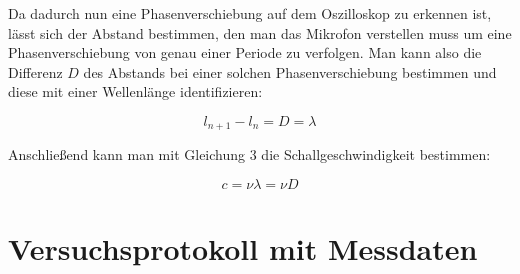 \documentclass{article}
\begin{document}
Da dadurch nun eine Phasenverschiebung auf dem Oszilloskop zu erkennen ist, lässt sich der Abstand bestimmen, den man das Mikrofon verstellen muss um eine Phasenverschiebung von genau einer Periode zu verfolgen. Man kann also die Differenz $D$ des Abstands bei einer solchen Phasenverschiebung bestimmen und diese mit einer Wellenlänge identifizieren:

\begin{equation}
    l_{n+1} - l_n = D = \lambda
\end{equation}

Anschließend kann man mit Gleichung 3 die Schallgeschwindigkeit bestimmen:

\begin{equation}
    c = \nu \lambda = \nu D
\end{equation}


\newpage

\section{Versuchsprotokoll mit Messdaten}
\end{document}
